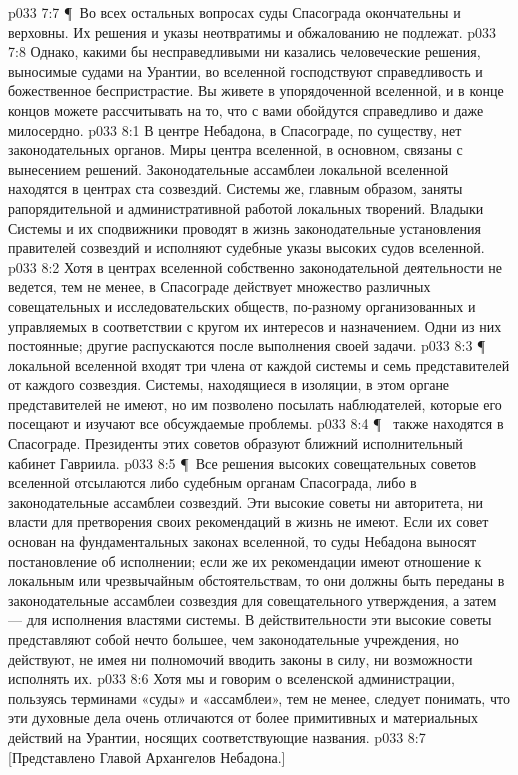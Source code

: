 \vs p033 7:7 \P\ Во всех остальных вопросах суды Спасограда окончательны и верховны. Их решения и указы неотвратимы и обжалованию не подлежат.
\vs p033 7:8 Однако, какими бы несправедливыми ни казались человеческие решения, выносимые судами на Урантии, во вселенной господствуют справедливость и божественное беспристрастие. Вы живете в упорядоченной вселенной, и в конце концов можете рассчитывать на то, что с вами обойдутся справедливо и даже милосердно.
\vs p033 8:1 В центре Небадона, в Спасограде, по существу, нет законодательных органов. Миры центра вселенной, в основном, связаны с вынесением решений. Законодательные ассамблеи локальной вселенной находятся в центрах ста созвездий. Системы же, главным образом, заняты рапорядительной и административной работой локальных творений. Владыки Системы и их сподвижники проводят в жизнь законодательные установления правителей созвездий и исполняют судебные указы высоких судов вселенной.
\vs p033 8:2 Хотя в центрах вселенной собственно законодательной деятельности не ведется, тем не менее, в Спасограде действует множество различных совещательных и исследовательских обществ, по\hyp{}разному организованных и управляемых в соответствии с кругом их интересов и назначением. Одни из них постоянные; другие распускаются после выполнения своей задачи.
\vs p033 8:3 \P\  локальной вселенной входят три члена от каждой системы и семь представителей от каждого созвездия. Системы, находящиеся в изоляции, в этом органе представителей не имеют, но им позволено посылать наблюдателей, которые его посещают и изучают все обсуждаемые проблемы.
\vs p033 8:4 \P\  также находятся в Спасограде. Президенты этих советов образуют ближний исполнительный кабинет Гавриила.
\vs p033 8:5 \P\ Все решения высоких совещательных советов вселенной отсылаются либо судебным органам Спасограда, либо в законодательные ассамблеи созвездий. Эти высокие советы ни авторитета, ни власти для претворения своих рекомендаций в жизнь не имеют. Если их совет основан на фундаментальных законах вселенной, то суды Небадона выносят постановление об исполнении; если же их рекомендации имеют отношение к локальным или чрезвычайным обстоятельствам, то они должны быть переданы в законодательные ассамблеи созвездия для совещательного утверждения, а затем --- для исполнения властями системы. В действительности эти высокие советы представляют собой нечто большее, чем законодательные учреждения, но действуют, не имея ни полномочий вводить законы в силу, ни возможности исполнять их.
\vs p033 8:6 Хотя мы и говорим о вселенской администрации, пользуясь терминами «суды» и «ассамблеи», тем не менее, следует понимать, что эти духовные дела очень отличаются от более примитивных и материальных действий на Урантии, носящих соответствующие названия.
\vs p033 8:7 [Представлено Главой Архангелов Небадона.]
